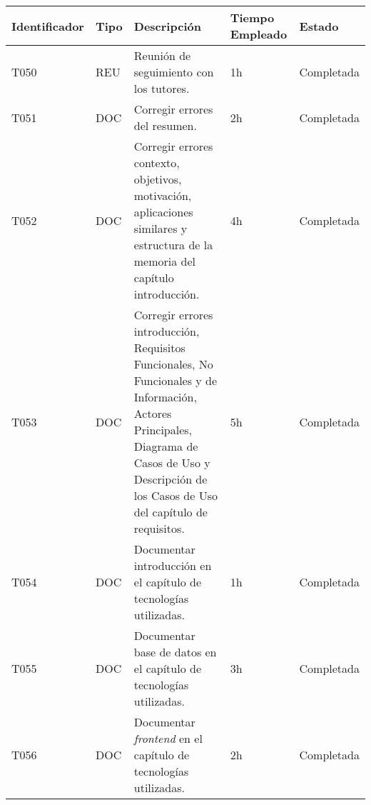 \begin{table}[]
  \centering
\begin{tabular}{
  |p{}%
  |p{}%
  |p{}
  |p{}
  |p{}
  |%
  }
  \hline
  \textbf{Identificador} & \textbf{Tipo} & \textbf{Descripción}                                             & \textbf{Tiempo Empleado} & \textbf{Estado} \\ \hline

  T050                   & REU           & Reunión de seguimiento con los tutores.                             & 1h                       & Completada      \\ \hline
 
  T051                   & DOC          & Corregir errores del resumen.                   & 2h                       & Completada      \\ \hline

  T052                   & DOC           & Corregir errores contexto, objetivos, motivación, aplicaciones similares y estructura de la memoria del capítulo introducción.                  & 4h                       & Completada      \\ \hline

  T053                   & DOC           & Corregir errores introducción, Requisitos Funcionales, No Funcionales y de Información, Actores Principales, Diagrama de Casos de Uso y Descripción de los Casos de Uso del capítulo de requisitos.                  & 5h                       & Completada      \\ \hline

  T054                   & DOC           & Documentar introducción en el capítulo de tecnologías utilizadas.            & 1h                       & Completada      \\ \hline

  T055                   & DOC           & Documentar base de datos en el capítulo de tecnologías utilizadas.            & 3h                       & Completada      \\ \hline

  T056                   & DOC           & Documentar \textit{frontend} en el capítulo de tecnologías utilizadas.            & 2h                       & Completada      \\ \hline


\end{tabular}
\end{table}
